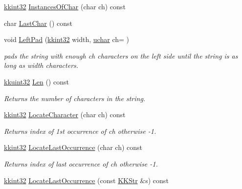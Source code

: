 \begin{DoxyCompactItemize}
\hyperlink{namespace_k_k_b_a8fa4952cc84fda1de4bec1fbdd8d5b1b}{kkint32} \hyperlink{class_k_k_b_1_1_k_k_str_a991f88d521f2df02abeb3f74c3d379d0}{Instances\+Of\+Char} (char ch) const 
\item 
char \hyperlink{class_k_k_b_1_1_k_k_str_ad1951ace757c18c2d01df666b3a4032c}{Last\+Char} () const 
\item 
void \hyperlink{class_k_k_b_1_1_k_k_str_a5fc76668dbfe28861b45ecebda941b7c}{Left\+Pad} (\hyperlink{namespace_k_k_b_a8fa4952cc84fda1de4bec1fbdd8d5b1b}{kkint32} width, \hyperlink{namespace_k_k_b_ace9969169bf514f9ee6185186949cdf7}{uchar} ch= \textquotesingle{} \textquotesingle{})
\begin{DoxyCompactList}\small\item\em pads the string with enough \textquotesingle{}ch\textquotesingle{} characters on the left side until the string is as long as \textquotesingle{}width\textquotesingle{} characters. \end{DoxyCompactList}\item 
\hyperlink{namespace_k_k_b_af8d832f05c54994a1cce25bd5743e19a}{kkuint32} \hyperlink{class_k_k_b_1_1_k_k_str_a869142d4855517c5c237afcb25dbbe36}{Len} () const 
\begin{DoxyCompactList}\small\item\em Returns the number of characters in the string. \end{DoxyCompactList}\item 
\hyperlink{namespace_k_k_b_a8fa4952cc84fda1de4bec1fbdd8d5b1b}{kkint32} \hyperlink{class_k_k_b_1_1_k_k_str_ad738b238e609887bbf27841f359046cd}{Locate\+Character} (char ch) const 
\begin{DoxyCompactList}\small\item\em Returns index of 1st occurrence of \textquotesingle{}ch\textquotesingle{} otherwise -\/1. \end{DoxyCompactList}\item 
\hyperlink{namespace_k_k_b_a8fa4952cc84fda1de4bec1fbdd8d5b1b}{kkint32} \hyperlink{class_k_k_b_1_1_k_k_str_a595b364acd17c015b5f66d9f7996bfab}{Locate\+Last\+Occurrence} (char ch) const 
\begin{DoxyCompactList}\small\item\em Returns index of last occurrence of \textquotesingle{}ch\textquotesingle{} otherwise -\/1. \end{DoxyCompactList}\item 
\hyperlink{namespace_k_k_b_a8fa4952cc84fda1de4bec1fbdd8d5b1b}{kkint32} \hyperlink{class_k_k_b_1_1_k_k_str_a18f99c825cf58d0b3945aac08c09abb1}{Locate\+Last\+Occurrence} (const \hyperlink{class_k_k_b_1_1_k_k_str}{K\+K\+Str} \&s) const 

\end{DoxyCompactItemize}
